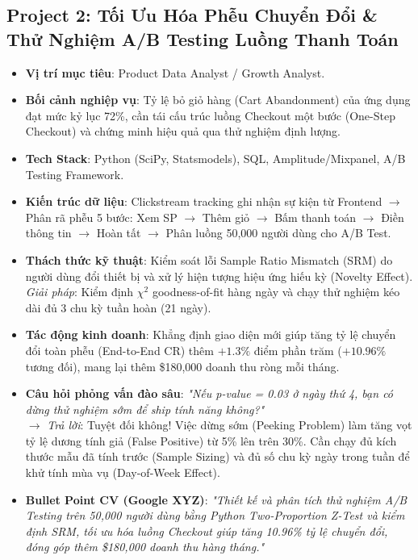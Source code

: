 \subsection{Project 2: Tối Ưu Hóa Phễu Chuyển Đổi \& Thử Nghiệm A/B Testing Luồng Thanh Toán}
\begin{itemize}
    \item \textbf{Vị trí mục tiêu}: Product Data Analyst / Growth Analyst.
    \item \textbf{Bối cảnh nghiệp vụ}: Tỷ lệ bỏ giỏ hàng (Cart Abandonment) của ứng dụng đạt mức kỷ lục 72\%, cần tái cấu trúc luồng Checkout một bước (One-Step Checkout) và chứng minh hiệu quả qua thử nghiệm định lượng.
    \item \textbf{Tech Stack}: Python (SciPy, Statsmodels), SQL, Amplitude/Mixpanel, A/B Testing Framework.
    \item \textbf{Kiến trúc dữ liệu}: Clickstream tracking ghi nhận sự kiện từ Frontend $\rightarrow$ Phân rã phễu 5 bước: Xem SP $\rightarrow$ Thêm giỏ $\rightarrow$ Bấm thanh toán $\rightarrow$ Điền thông tin $\rightarrow$ Hoàn tất $\rightarrow$ Phân luồng 50,000 người dùng cho A/B Test.
    \item \textbf{Thách thức kỹ thuật}: Kiểm soát lỗi Sample Ratio Mismatch (SRM) do người dùng đổi thiết bị và xử lý hiện tượng hiệu ứng hiếu kỳ (Novelty Effect). \textit{Giải pháp}: Kiểm định $\chi^2$ goodness-of-fit hàng ngày và chạy thử nghiệm kéo dài đủ 3 chu kỳ tuần hoàn (21 ngày).
    \item \textbf{Tác động kinh doanh}: Khẳng định giao diện mới giúp tăng tỷ lệ chuyển đổi toàn phễu (End-to-End CR) thêm $+1.3\%$ điểm phần trăm ($+10.96\%$ tương đối), mang lại thêm \$180,000 doanh thu ròng mỗi tháng.
    \item \textbf{Câu hỏi phỏng vấn đào sâu}: \textit{"Nếu p-value = 0.03 ở ngày thứ 4, bạn có dừng thử nghiệm sớm để ship tính năng không?"} \\
    $\rightarrow$ \textit{Trả lời}: Tuyệt đối không! Việc dừng sớm (Peeking Problem) làm tăng vọt tỷ lệ dương tính giả (False Positive) từ 5\% lên trên 30\%. Cần chạy đủ kích thước mẫu đã tính trước (Sample Sizing) và đủ số chu kỳ ngày trong tuần để khử tính mùa vụ (Day-of-Week Effect).
    \item \textbf{Bullet Point CV (Google XYZ)}: \textit{"Thiết kế và phân tích thử nghiệm A/B Testing trên 50,000 người dùng bằng Python Two-Proportion Z-Test và kiểm định SRM, tối ưu hóa luồng Checkout giúp tăng 10.96\% tỷ lệ chuyển đổi, đóng góp thêm \$180,000 doanh thu hàng tháng."}
\end{itemize}

